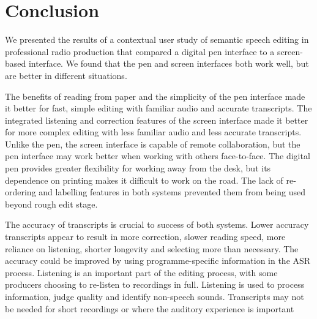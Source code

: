 \section{Conclusion}\label{sec:paper-conclusion}
We presented the results of a contextual user study of semantic speech editing in professional radio production that
compared a digital pen interface to a screen-based interface.  We found that the pen and screen interfaces both work
well, but are better in different situations.

The benefits of reading from paper and the simplicity of the pen interface made it better for fast, simple editing with
familiar audio and accurate transcripts.  The integrated listening and correction features of the screen interface made
it better for more complex editing with less familiar audio and less accurate transcripts.  Unlike the pen, the screen
interface is capable of remote collaboration, but the pen interface may work better when working with others
face-to-face.  The digital pen provides greater flexibility for working away from the desk, but its dependence on
printing makes it difficult to work on the road.  The lack of re-ordering and labelling features in both systems
prevented them from being used beyond rough edit stage.

The accuracy of transcripts is crucial to success of both systems. Lower accuracy transcripts appear to result in more
correction, slower reading speed, more reliance on listening, shorter longevity and selecting more than necessary. The
accuracy could be improved by using programme-specific information in the ASR process.  Listening is an
important part of the editing process, with some producers choosing to re-listen to recordings in full.  Listening is
used to process information, judge quality and identify non-speech sounds. Transcripts may not be needed for short
recordings or where the auditory experience is important

